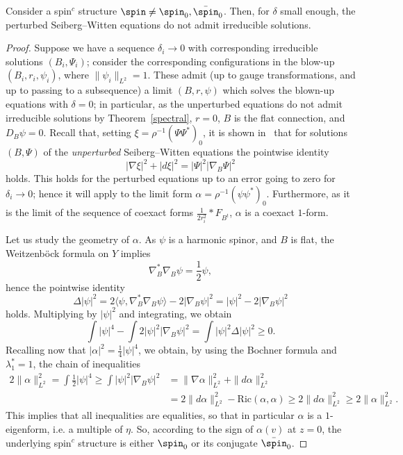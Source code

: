\begin{lemm}
Consider a spin$^c$ structure $\spin\neq \spin_0, \bar{\spin}_0$. Then, for $\delta$ small enough, the perturbed Seiberg--Witten equations do not admit irreducible solutions.
\end{lemm}

\begin{proof}
Suppose we have a sequence $\delta_i\rightarrow 0$ with corresponding irreducible solutions $(B_i,\Psi_i)$; consider the corresponding configurations in the blow-up $(B_i,r_i,\psi_i)$, where $\|\psi_i\|_{L^2}=1$. These admit (up to gauge transformations, and up to passing to a subsequence) a limit $(B,r,\psi)$ which solves the blown-up equations with $\delta=0$; in particular, as the unperturbed equations do not admit irreducible solutions by Theorem~\ref{spectral}, $r=0$, $B$ is the flat connection, and $D_B\psi=0$. Recall that, setting $\xi=\rho^{-1}(\Psi\Psi^*)_0$, it is shown in~\cite[Proposition~$1$]{LL} that for solutions $(B,\Psi)$ of the \emph{unperturbed} Seiberg--Witten equations the pointwise identity
\[
|\nabla\xi|^2+|d\xi|^2=|\Psi|^2|\nabla_B\Psi|^2
\]
holds. This holds for the perturbed equations up to an error going to zero for $\delta_i\rightarrow 0$; hence it will apply to the limit form $\alpha=\rho^{-1}(\psi\psi^*)_0$. Furthermore, as it is the limit of the sequence of coexact forms $\frac{1}{2r_i^2}\ast F_{B^t}$, $\alpha$ is a coexact $1$-form.


Let us study the geometry of $\alpha$. As $\psi$ is a harmonic spinor, and $B$ is flat, the Weitzenb\"ock formula on $Y$ implies
\[
\nabla_B^*\nabla_B \psi=\frac{1}{2}\psi,
\]
hence the pointwise identity
\[
\Delta|\psi|^2=2\langle \psi, \nabla_B^*\nabla_B \psi\rangle-2|\nabla_B\psi|^2=| \psi|^2-2|\nabla_B\psi|^2
\]
holds. Multiplying by $|\psi|^2$ and integrating, we obtain
\[
\int | \psi|^4-\int 2| \psi|^2|\nabla_B\psi|^2=\int | \psi|^2\Delta|\psi|^2\geq0.
\]
Recalling now that $|\alpha|^2=\frac{1}{4}|\psi|^4$, we obtain, by using the Bochner formula and $\lambda_1^*=1$, the chain of inequalities
\begin{align*}
2\|\alpha\|^2_{L^2}=\int\frac{1}{2}|\psi|^4\geq \int | \psi|^2|\nabla_B\psi|^2&=\|\nabla\alpha\|^2_{L^2}+\|d\alpha\|^2_{L^2}\\
&=2\|d\alpha\|^2_{L^2}-\mathrm{Ric}(\alpha,\alpha)\geq2\|d\alpha\|^2_{L^2}\geq 2\|\alpha\|^2_{L^2}.
\end{align*}
This implies that all inequalities are equalities, so that in particular $\alpha$ is a $1$-eigenform, i.e. a multiple of $\eta$. So, according to the sign of $\alpha(v)$ at $z=0$, the underlying spin$^c$ structure is either $\spin_0$ or its conjugate $\bar{\spin}_0$.
\end{proof}

